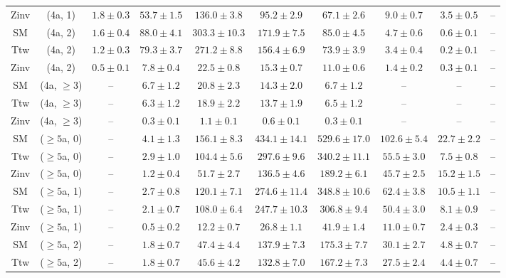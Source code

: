 \begin{table}[h!]
{\begin{tabular}{cccccccccc}
	Zinv & (4a, 1) & $1.8\pm 0.3$ & $53.7\pm 1.5$ & $136.0\pm 3.8$ & $95.2\pm 2.9$ & $67.1\pm 2.6$ & $9.0\pm 0.7$ & $3.5\pm 0.5$ & -- \\[0.5ex] 
	SM & (4a, 2) & $1.6\pm 0.4$ & $88.0\pm 4.1$ & $303.3\pm 10.3$ & $171.9\pm 7.5$ & $85.0\pm 4.5$ & $4.7\pm 0.6$ & $0.6\pm 0.1$ & -- \\[0.5ex] 
	Ttw & (4a, 2) & $1.2\pm 0.3$ & $79.3\pm 3.7$ & $271.2\pm 8.8$ & $156.4\pm 6.9$ & $73.9\pm 3.9$ & $3.4\pm 0.4$ & $0.2\pm 0.1$ & -- \\[0.5ex] 
	Zinv & (4a, 2) & $0.5\pm 0.1$ & $7.8\pm 0.4$ & $22.5\pm 0.8$ & $15.3\pm 0.7$ & $11.0\pm 0.6$ & $1.4\pm 0.2$ & $0.3\pm 0.1$ & -- \\[0.5ex] 
	SM & (4a, $\ge3$) & -- & $6.7\pm 1.2$ & $20.8\pm 2.3$ & $14.3\pm 2.0$ & $6.7\pm 1.2$ & -- & -- & -- \\[0.5ex] 
	Ttw & (4a, $\ge3$) & -- & $6.3\pm 1.2$ & $18.9\pm 2.2$ & $13.7\pm 1.9$ & $6.5\pm 1.2$ & -- & -- & -- \\[0.5ex] 
	Zinv & (4a, $\ge3$) & -- & $0.3\pm 0.1$ & $1.1\pm 0.1$ & $0.6\pm 0.1$ & $0.3\pm 0.1$ & -- & -- & -- \\[0.5ex] 
	SM & ($\ge5$a, 0) & -- & $4.1\pm 1.3$ & $156.1\pm 8.3$ & $434.1\pm 14.1$ & $529.6\pm 17.0$ & $102.6\pm 5.4$ & $22.7\pm 2.2$ & -- \\[0.5ex] 
	Ttw & ($\ge5$a, 0) & -- & $2.9\pm 1.0$ & $104.4\pm 5.6$ & $297.6\pm 9.6$ & $340.2\pm 11.1$ & $55.5\pm 3.0$ & $7.5\pm 0.8$ & -- \\[0.5ex] 
	Zinv & ($\ge5$a, 0) & -- & $1.2\pm 0.4$ & $51.7\pm 2.7$ & $136.5\pm 4.6$ & $189.2\pm 6.1$ & $45.7\pm 2.5$ & $15.2\pm 1.5$ & -- \\[0.5ex] 
	SM & ($\ge5$a, 1) & -- & $2.7\pm 0.8$ & $120.1\pm 7.1$ & $274.6\pm 11.4$ & $348.8\pm 10.6$ & $62.4\pm 3.8$ & $10.5\pm 1.1$ & -- \\[0.5ex] 
	Ttw & ($\ge5$a, 1) & -- & $2.1\pm 0.7$ & $108.0\pm 6.4$ & $247.7\pm 10.3$ & $306.8\pm 9.4$ & $50.4\pm 3.0$ & $8.1\pm 0.9$ & -- \\[0.5ex] 
	Zinv & ($\ge5$a, 1) & -- & $0.5\pm 0.2$ & $12.2\pm 0.7$ & $26.8\pm 1.1$ & $41.9\pm 1.4$ & $11.0\pm 0.7$ & $2.4\pm 0.3$ & -- \\[0.5ex] 
	SM & ($\ge5$a, 2) & -- & $1.8\pm 0.7$ & $47.4\pm 4.4$ & $137.9\pm 7.3$ & $175.3\pm 7.7$ & $30.1\pm 2.7$ & $4.8\pm 0.7$ & -- \\[0.5ex] 
	Ttw & ($\ge5$a, 2) & -- & $1.8\pm 0.7$ & $45.6\pm 4.2$ & $132.8\pm 7.0$ & $167.2\pm 7.3$ & $27.5\pm 2.4$ & $4.4\pm 0.7$ & -- \\[0.5ex] 

\end{tabular}}
\end{table}
